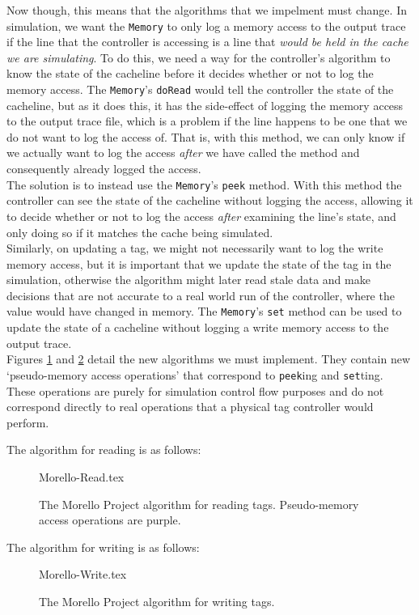 Now though, this means that the algorithms that we impelment must change. In simulation, we want the \texttt{Memory} to only log a memory access to the output trace if the line that the controller is accessing is a line that \textit{would be held in the cache we are simulating}. To do this, we need a way for the controller's algorithm to know the state of the cacheline before it decides whether or not to log the memory access. The \texttt{Memory}'s \texttt{doRead} would tell the controller the state of the cacheline, but as it does this, it has the side-effect of logging the memory access to the output trace file, which is a problem if the line happens to be one that we do not want to log the access of. That is, with this method, we can only know if we actually want to log the access \textit{after} we have called the method and consequently already logged the access.\\
The solution is to instead use the \texttt{Memory}'s \texttt{peek} method. With this method the controller can see the state of the cacheline without logging the access, allowing it to decide whether or not to log the access \textit{after} examining the line's state, and only doing so if it matches the cache being simulated.\\
Similarly, on updating a tag, we might not necessarily want to log the write memory access, but it is important that we update the state of the tag in the simulation, otherwise the algorithm might later read stale data and make decisions that are not accurate to a real world run of the controller, where the value would have changed in memory. The \texttt{Memory}'s \texttt{set} method can be used to update the state of a cacheline without logging a write memory access to the output trace.\\
Figures \ref{fig:mrr} and \ref{fig:mrw} detail the new algorithms we must implement. They contain new `pseudo-memory access operations' that correspond to \texttt{peek}ing and \texttt{set}ting. These operations are purely for simulation control flow purposes and do not correspond directly to real operations that a physical tag controller would perform.

The algorithm for reading is as follows:
\begin{figure}[H]
	\centering
	{Morello-Read.tex}
	\caption{The Morello Project algorithm for reading tags. Pseudo-memory access operations are purple.}
	\label{fig:mrr}
\end{figure}

The algorithm for writing is as follows:
\begin{figure}[H]
	\centering
	{Morello-Write.tex}
	\caption{The Morello Project algorithm for writing tags.}
	\label{fig:mrw}
\end{figure}

